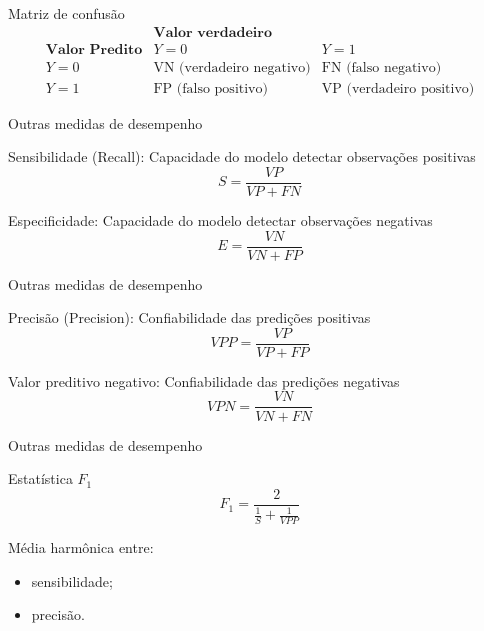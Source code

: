 \documentclass[
  ignorenonframetext,
  aspectratio=169,
]{beamer}
\providecommand{\tightlist}{%
  \setlength{\itemsep}{0pt}\setlength{\parskip}{0pt}}
\begin{document}
\begin{frame}
\begin{block}{Matriz de confusão}
\label{matriz-de-confusuxe3o}
\[
\begin{array}{c|cc}
 & \textbf{Valor verdadeiro} & \\
\textbf{Valor Predito} & Y=0 & Y=1 \\
\hline
Y=0 & \text{VN (verdadeiro negativo)} & \text{FN (falso negativo)} \\
Y=1 & \text{FP (falso positivo)} & \text{VP (verdadeiro positivo)}
\end{array}
\]
\end{block}
\end{frame}

\begin{frame}{Outras medidas de desempenho}
\label{outras-medidas-de-desempenho-1}
\begin{block}{Sensibilidade (Recall): Capacidade do modelo detectar
observações positivas}
\label{sensibilidade-recall-capacidade-do-modelo-detectar-observauxe7uxf5es-positivas}
\[
S=\frac{VP}{VP+FN}
\]
\end{block}

\begin{block}{Especificidade: Capacidade do modelo detectar observações
negativas}
\label{especificidade-capacidade-do-modelo-detectar-observauxe7uxf5es-negativas}
\[
E=\frac{VN}{VN+FP}
\]
\end{block}
\end{frame}

\begin{frame}{Outras medidas de desempenho}
\label{outras-medidas-de-desempenho-2}
\begin{block}{Precisão (Precision): Confiabilidade das predições
positivas}
\label{precisuxe3o-precision-confiabilidade-das-prediuxe7uxf5es-positivas}
\[
VPP=\frac{VP}{VP+FP}
\]
\end{block}

\begin{block}{Valor preditivo negativo: Confiabilidade das predições
negativas}
\label{valor-preditivo-negativo-confiabilidade-das-prediuxe7uxf5es-negativas}
\[
VPN=\frac{VN}{VN+FN}
\]
\end{block}
\end{frame}

\begin{frame}{Outras medidas de desempenho}
\label{outras-medidas-de-desempenho-3}
\begin{block}{Estatística \(F_1\)}
\label{estatuxedstica-f_1}
\[
F_1=
\frac{2}{\frac{1}{S}+\frac{1}{VPP}}
\]

Média harmônica entre:

\begin{itemize}
\tightlist
\item
  sensibilidade;
\item
  precisão.
\end{itemize}
\end{block}
\end{frame}
\end{document}
